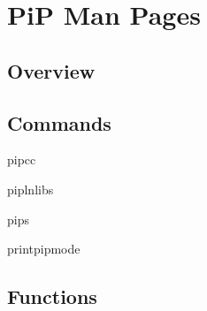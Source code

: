 \documentclass[twoside]{book}
\begin{document}
\section*{Pi\-P Man Pages}

\subsection*{Overview}

\subsection*{Commands}


\begin{DoxyItemize}
\item pipcc
\item piplnlibs
\item pips
\item printpipmode
\end{DoxyItemize}

\subsection*{Functions}
\end{document}
